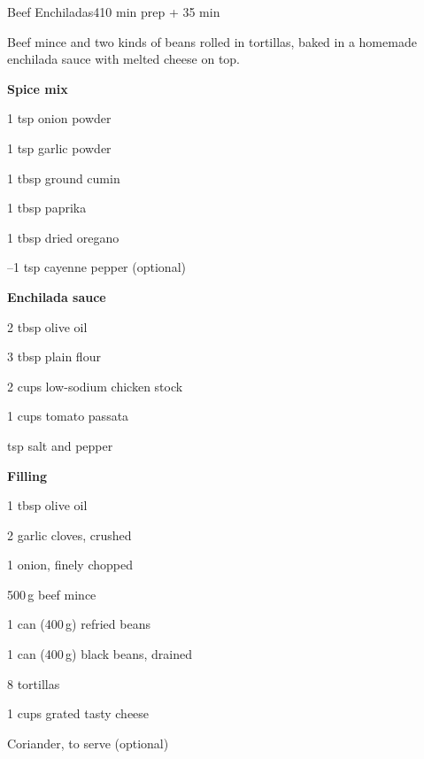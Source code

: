\begin{recipebox}{Beef Enchiladas}{4}{10 min prep + 35 min}

Beef mince and two kinds of beans rolled in tortillas, baked in a homemade
enchilada sauce with melted cheese on top.

\begin{ingredients}
  \item[] \textbf{Spice mix}
  \item 1 tsp onion powder
  \item 1 tsp garlic powder
  \item 1 tbsp ground cumin
  \item 1 tbsp paprika
  \item 1 tbsp dried oregano
  \item {}--1 tsp cayenne pepper (optional)
  \item[] \textbf{Enchilada sauce}
  \item 2 tbsp olive oil
  \item 3 tbsp plain flour
  \item 2 cups low-sodium chicken stock
  \item 1 cups tomato passata
  \item {} tsp salt and pepper
  \item[] \textbf{Filling}
  \item 1 tbsp olive oil
  \item 2 garlic cloves, crushed
  \item 1 onion, finely chopped
  \item 500\,g beef mince
  \item 1 can (400\,g) refried beans
  \item 1 can (400\,g) black beans, drained
  \item 8 tortillas
  \item 1 cups grated tasty cheese
  \item Coriander, to serve (optional)
\end{ingredients}


\end{recipebox}
